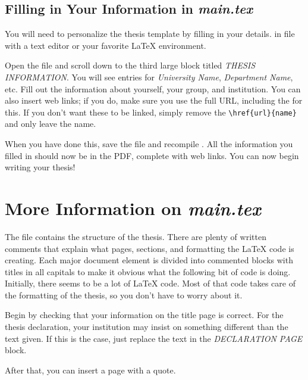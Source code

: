 \subsection{Filling in Your Information in \emph{main.tex}}\label{FillingFile}

You will need to personalize the thesis template by filling in your details. in   file with a text editor or your favorite LaTeX environment.

Open the file and scroll down to the third large block titled \emph{THESIS INFORMATION}. You will see entries for \emph{University Name}, \emph{Department Name}, etc. Fill out the information about yourself, your group, and institution.%
You can also insert web links; if you do, make sure you use the full URL, including the  for this. If you don't want these to be linked, simply remove the \verb|\href{url}{name}| and only leave the name.

When you have done this, save the file and recompile . All the information you filled in should now be in the PDF, complete with web links. You can now begin writing your thesis!


\section{More Information on \emph{main.tex}}

The  file contains the structure of the thesis. There are plenty of written comments that explain what pages, sections, and formatting the LaTeX code is creating. Each major document element is divided into commented blocks with titles in all capitals to make it obvious what the following bit of code is doing. Initially, there seems to be a lot of LaTeX code. Most of that code takes care of the formatting of the thesis, so you don't have to worry about it.

Begin%
 by checking that your information on the title page is correct. For the thesis declaration, your institution may insist on something different than the text given. If this is the case, just replace the text in the \emph{DECLARATION PAGE} block.

After that, you can insert a page with a quote.

